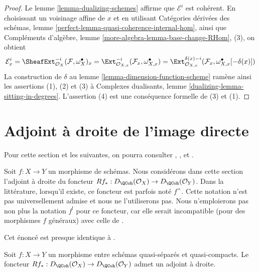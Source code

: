 \begin{proof}
Le lemme \ref{lemma-dualizing-schemes} affirme que $\mathcal{E}^i$ est cohérent. En choisissant un voisinage affine de $x$ et en utilisant Catégories dérivées des schémas, lemme \ref{perfect-lemma-quasi-coherence-internal-hom}, ainsi que Compléments d'algèbre, lemme \ref{more-algebra-lemma-base-change-RHom}, (3), on obtient
$$
\mathcal{E}^i_x =
\SheafExt^{-i}_{\mathcal{O}_X}(\mathcal{F}, \omega_X^\bullet)_x =
\Ext^{-i}_{\mathcal{O}_{X, x}}(\mathcal{F}_x,
\omega_{X, x}^\bullet) =
\Ext^{\delta(x) - i}_{\mathcal{O}_{X, x}}(\mathcal{F}_x,
\omega_{X, x}^\bullet[-\delta(x)])
$$
La construction de $\delta$ au lemme \ref{lemma-dimension-function-scheme} ramène ainsi les assertions (1), (2) et (3) à Complexes dualisants, lemme \ref{dualizing-lemma-sitting-in-degrees}. L'assertion (4) est une conséquence formelle de (3) et (1).
\end{proof}




\section{Adjoint à droite de l'image directe}
\label{section-twisted-inverse-image}

\noindent
Pour cette section et les suivantes, on pourra consulter \cite{Neeman-Grothendieck}, \cite{LN}, \cite{Lipman-notes} et \cite{Neeman-improvement}.

\medskip\noindent
Soit $f : X \to Y$ un morphisme de schémas. Nous considérons dans cette section l'adjoint à droite du foncteur $Rf_* : D_\QCoh(\mathcal{O}_X) \to D_\QCoh(\mathcal{O}_Y)$. Dans la littérature, lorsqu'il existe, ce foncteur est parfois noté $f^{\times}$. Cette notation n'est pas universellement admise et nous ne l'utiliserons pas. Nous n'emploierons pas non plus la notation $f^!$ pour ce foncteur, car elle serait incompatible (pour des morphismes $f$ généraux) avec celle de \cite{RD}.

\begin{lemma}
\label{lemma-twisted-inverse-image}
\begin{reference}
Cet énoncé est presque identique à \cite[Example 4.2]{Neeman-Grothendieck}.
\end{reference}
Soit $f : X \to Y$ un morphisme entre schémas quasi-séparés et quasi-compacts. Le foncteur $Rf_* : D_\QCoh(\mathcal{O}_X) \to D_\QCoh(\mathcal{O}_Y)$ admet un adjoint à droite.
\end{lemma}

